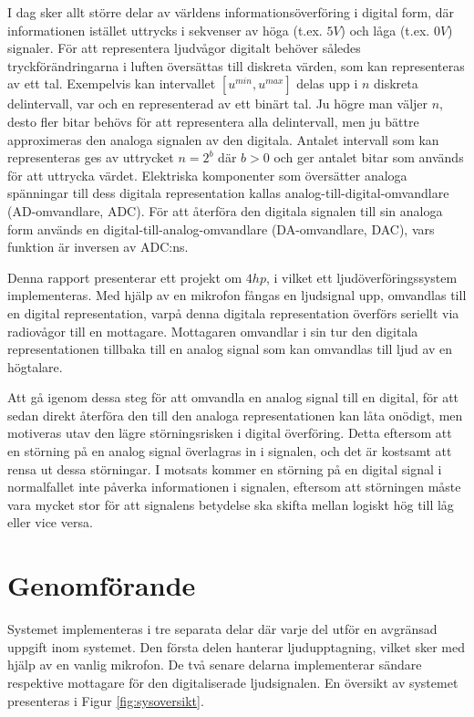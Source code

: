 \documentclass[a4paper,10pt]{article}
\begin{document}
I dag sker allt större delar av världens informationsöverföring i digital form, 
där informationen istället uttrycks i sekvenser av höga (t.ex. $5V$) och låga
(t.ex. $0V$) signaler. För att representera ljudvågor digitalt behöver således 
tryckförändringarna i luften översättas till diskreta värden, som kan 
representeras av ett tal.
Exempelvis kan intervallet $[u^{min}, u^{max}]$ delas upp i $n$ diskreta 
delintervall, var och en representerad av ett binärt tal. Ju högre man väljer
$n$, desto fler bitar behövs för att representera alla delintervall, men ju
bättre approximeras den analoga signalen av den digitala. Antalet intervall som 
kan representeras ges av uttrycket $n = 2^b$ där $b > 0$ och ger antalet bitar 
som används för att uttrycka värdet. Elektriska komponenter som översätter 
analoga spänningar till dess digitala representation kallas 
analog-till-digital-omvandlare (AD-omvandlare, ADC). 
För att återföra den digitala signalen till sin analoga form används en
digital-till-analog-omvandlare (DA-omvandlare, DAC), vars funktion är
inversen av ADC:ns. 

Denna rapport presenterar ett projekt om $4 hp$, i vilket ett 
ljudöverföringssystem implementeras. Med hjälp av en mikrofon fångas en 
ljudsignal upp, omvandlas till en digital representation, varpå denna digitala 
representation överförs seriellt via radiovågor till en mottagare. Mottagaren 
omvandlar i sin tur den digitala representationen tillbaka till en analog signal 
som kan omvandlas till ljud av en högtalare.

Att gå igenom dessa steg för att omvandla en analog signal till en digital, för
att sedan direkt återföra den till den analoga representationen kan låta 
onödigt, men motiveras utav den lägre störningsrisken i digital överföring. 
Detta eftersom att en störning på en analog signal överlagras in i signalen, och
det är kostsamt att rensa ut dessa störningar. I motsats kommer en störning på
en digital signal i normalfallet inte påverka informationen i signalen, eftersom
att störningen måste vara mycket stor för att signalens betydelse ska skifta
mellan logiskt hög till låg eller vice versa.


\section{Genomförande}

Systemet implementeras i tre separata delar där varje del utför en avgränsad 
uppgift inom systemet. Den första delen hanterar ljudupptagning, vilket sker med
hjälp av en vanlig mikrofon. De två senare delarna implementerar sändare
respektive mottagare för den digitaliserade ljudsignalen. En översikt av 
systemet presenteras i Figur \ref{fig:sysoversikt}.
\end{document}
